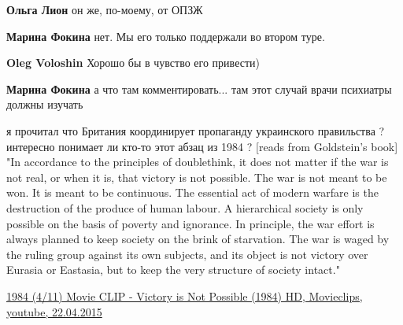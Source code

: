 \begin{itemize}
\begin{itemize}
\textbf{Ольга Лион} он же, по-моему, от ОПЗЖ

 
\textbf{Марина Фокина} нет. Мы его только поддержали во втором туре.

 
\textbf{Oleg Voloshin} Хорошо бы в чувство его привести)

 
\textbf{Марина Фокина} а что там комментировать... там этот случай врачи психиатры должны изучать \Smiley[1.0][yellow]
\end{itemize}

 

я прочитал что Британия координирует пропаганду украинского правильства ?
интересно понимает ли кто-то этот абзац из 1984 ? [reads from Goldstein's book]
"In accordance to the principles of doublethink, it does not matter if the war
is not real, or when it is, that victory is not possible. The war is not meant
to be won. It is meant to be continuous. The essential act of modern warfare is
the destruction of the produce of human labour. A hierarchical society is only
possible on the basis of poverty and ignorance. In principle, the war effort is
always planned to keep society on the brink of starvation. The war is waged by
the ruling group against its own subjects, and its object is not victory over
Eurasia or Eastasia, but to keep the very structure of society intact." 

\href{https://www.youtube.com/watch?v=c0wH6YDfCzg}{%
1984 (4/11) Movie CLIP - Victory is Not Possible (1984) HD, Movieclips, youtube, 22.04.2015%
}


\end{itemize}
